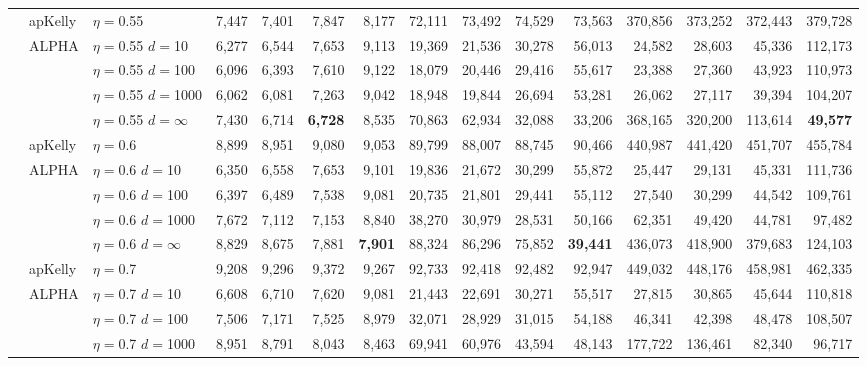 \documentclass[aoas]{imsart}
\begin{document}
\begin{table}
\begin{tabular}{lll|rrrr|rrrr|rrrr}
\cline{2-15} & apKelly & $\eta=$0.55 & 7,447  & 7,401  & 7,847  & 8,177  & 72,111  & 73,492  & 74,529  & 73,563  & 370,856  & 373,252  & 372,443  & 379,728  \\
\cline{2-15}
& ALPHA & $\eta=$0.55 $d=$10 & 6,277  & 6,544  & 7,653  & 9,113  & 19,369  & 21,536  & 30,278  & 56,013  & 24,582  & 28,603  & 45,336  & 112,173  \\
&  & $\eta=$0.55 $d=$100 & 6,096  & 6,393  & 7,610  & 9,122  & 18,079  & 20,446  & 29,416  & 55,617  & 23,388  & 27,360  & 43,923  & 110,973  \\
&  & $\eta=$0.55 $d=$1000 & 6,062  & 6,081  & 7,263  & 9,042  & 18,948  & 19,844  & 26,694  & 53,281  & 26,062  & 27,117  & 39,394  & 104,207  \\
 &  & $\eta=$0.55 $d=\infty$ & 7,430  & 6,714  & \bf{6,728}  & 8,535   & 70,863  & 62,934  & 32,088  & 33,206  & 368,165  & 320,200  & 113,614  & \bf{49,577}  \\
\cline{2-15} & apKelly & $\eta=$0.6 & 8,899  & 8,951  & 9,080  & 9,053  & 89,799  & 88,007  & 88,745  & 90,466  & 440,987  & 441,420  & 451,707  & 455,784  \\
\cline{2-15}
& ALPHA & $\eta=$0.6 $d=$10 & 6,350  & 6,558  & 7,653  & 9,101  & 19,836  & 21,672  & 30,299  & 55,872  & 25,447  & 29,131  & 45,331  & 111,736  \\
&  & $\eta=$0.6 $d=$100 & 6,397  & 6,489  & 7,538  & 9,081  & 20,735  & 21,801  & 29,441  & 55,112  & 27,540  & 30,299  & 44,542  & 109,761  \\
&  & $\eta=$0.6 $d=$1000 & 7,672  & 7,112  & 7,153  & 8,840  & 38,270  & 30,979  & 28,531  & 50,166  & 62,351  & 49,420  & 44,781  & 97,482  \\
 &  & $\eta=$0.6 $d=\infty$ & 8,829  & 8,675  & 7,881  & \bf{7,901}  & 88,324  & 86,296  & 75,852  & \bf{39,441}  & 436,073  & 418,900  & 379,683  & 124,103  \\
\cline{2-15} & apKelly & $\eta=$0.7 & 9,208  & 9,296  & 9,372  & 9,267  & 92,733  & 92,418  & 92,482  & 92,947  & 449,032  & 448,176  & 458,981  & 462,335  \\
\cline{2-15}
& ALPHA & $\eta=$0.7 $d=$10 & 6,608  & 6,710  & 7,620  & 9,081  & 21,443  & 22,691  & 30,271  & 55,517  & 27,815  & 30,865  & 45,644  & 110,818  \\
&  & $\eta=$0.7 $d=$100 & 7,506  & 7,171  & 7,525  & 8,979  & 32,071  & 28,929  & 31,015  & 54,188  & 46,341  & 42,398  & 48,478  & 108,507  \\
&  & $\eta=$0.7 $d=$1000 & 8,951  & 8,791  & 8,043  & 8,463  & 69,941  & 60,976  & 43,594  & 48,143  & 177,722  & 136,461  & 82,340  & 96,717  \\

\end{tabular}
\end{table}
\end{document}
